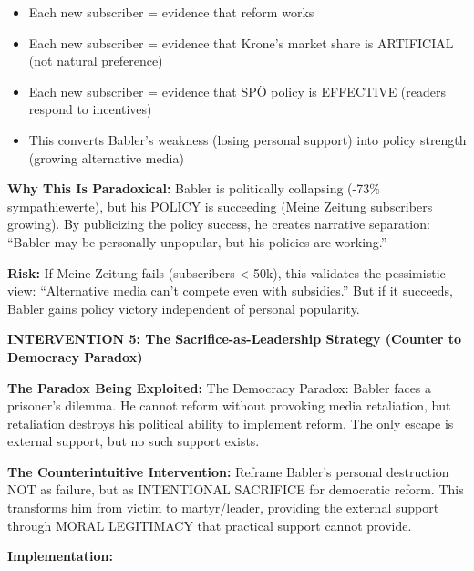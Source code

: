 \begin{enumerate}
  \begin{itemize}
  \item Each new subscriber = evidence that reform works
  \item Each new subscriber = evidence that Krone's market share is ARTIFICIAL (not natural preference)
  \item Each new subscriber = evidence that SPÖ policy is EFFECTIVE (readers respond to incentives)
  \item This converts Babler's weakness (losing personal support) into policy strength (growing alternative media)
  \end{itemize}

\end{enumerate}

\textbf{Why This Is Paradoxical:} Babler is politically collapsing (-73\% sympathiewerte), but his POLICY is succeeding
(Meine Zeitung subscribers growing). By publicizing the policy success, he creates narrative separation: ``Babler may
be personally unpopular, but his policies are working.''

\textbf{Risk:} If Meine Zeitung fails (subscribers < 50k), this validates the pessimistic view: ``Alternative media
can't compete even with subsidies.'' But if it succeeds, Babler gains policy victory independent of personal popularity.

\vspace{0.5cm}

\textbf{INTERVENTION 5: The Sacrifice-as-Leadership Strategy (Counter to Democracy Paradox)}

\textbf{The Paradox Being Exploited:} The Democracy Paradox: Babler faces a prisoner's dilemma. He cannot reform
without provoking media retaliation, but retaliation destroys his political ability to implement reform. The only
escape is external support, but no such support exists.

\textbf{The Counterintuitive Intervention:} Reframe Babler's personal destruction NOT as failure, but as
INTENTIONAL SACRIFICE for democratic reform. This transforms him from victim to martyr/leader, providing the
external support through MORAL LEGITIMACY that practical support cannot provide.

\textbf{Implementation:}

